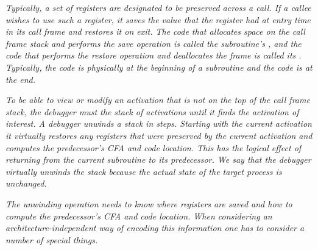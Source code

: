 \textit{Typically, a set of registers are designated to be preserved
across a call. If a callee wishes to use such a register, it
saves the value that the register had at entry time in its call
frame and restores it on exit. The code that allocates space
on the call frame stack and performs the save operation is
called the subroutine\textquoteright s , and the code that performs
the restore operation and deallocates the frame is called its
. Typically, the 
 code is physically at the
beginning of a subroutine and the 
 code is at the end.}

\textit{To be able to view or modify an activation that is not
on the top of the call frame stack, the debugger must
 the stack of activations until
it finds the activation of interest.  A debugger unwinds
a stack in steps. Starting with the current activation it
virtually restores any registers that were preserved by the
current activation and computes the predecessor\textquoteright s CFA and
code location. This has the logical effect of returning from
the current subroutine to its predecessor. We say that the
debugger virtually unwinds the stack because the actual state
of the target process is unchanged.}

\textit{The unwinding operation needs to know where registers are
saved and how to compute the predecessor\textquoteright s CFA and code
location. When considering an architecture-independent way
of encoding this information one has to consider a number of
special things.}


